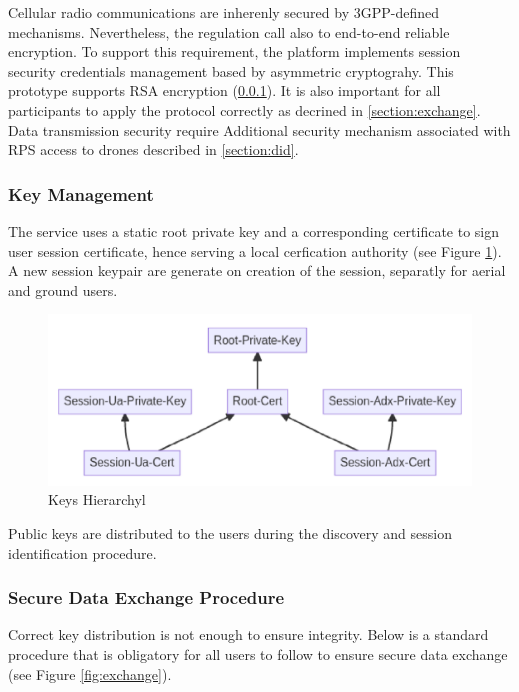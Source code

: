 \documentclass[a4paper,conference]{IEEEtran}
\begin{document}
Cellular radio communications are inherenly secured by 3GPP-defined mechanisms. Nevertheless, the regulation call also to end-to-end reliable encryption. To support this requirement, the platform implements session security credentials management based by asymmetric cryptograhy. This prototype supports RSA encryption (\ref{section:keys}). It is also important for all participants to apply the protocol correctly as decrined in \ref{section:exchange}. Data transmission security require  Additional security mechanism associated with RPS access to drones described in \ref{section:did}.

\subsubsection{Key Management}
\label{section:keys}

The service uses a static root private key and a corresponding certificate to sign user session certificate, hence serving a local cerfication authority (see Figure \ref{fig:keys}). A new session keypair are generate on creation of the session, separatly for aerial and ground users. 

\begin{figure}[!ht]
\centering
\includegraphics[width=0.9\linewidth]{images/keys.png}
\caption{Keys Hierarchyl}\label{fig:keys}
\end{figure}

Public keys are distributed to the users during the discovery and session identification procedure.

\subsubsection{Secure Data Exchange Procedure}

Correct key distribution is not enough to ensure integrity. Below is a standard procedure that is obligatory for all users to follow to ensure secure data exchange (see Figure \ref{fig:exchange}).
\end{document}
